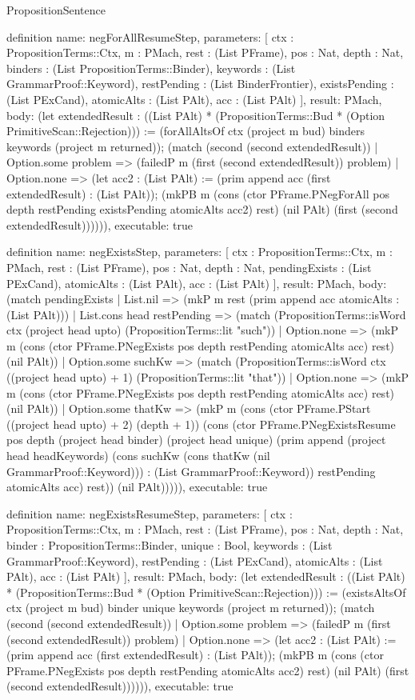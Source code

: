 \begin{lexlean}{PropositionSentence}
\begin{semanticmodule}
definition{
  name: negForAllResumeStep,
  parameters: [
    ctx : PropositionTerms::Ctx,
    m : PMach,
    rest : (List PFrame),
    pos : Nat,
    depth : Nat,
    binders : (List PropositionTerms::Binder),
    keywords : (List GrammarProof::Keyword),
    restPending : (List BinderFrontier),
    existsPending : (List PExCand),
    atomicAlts : (List PAlt),
    acc : (List PAlt)
  ],
  result: PMach,
  body: (let extendedResult : ((List PAlt) * (PropositionTerms::Bud * (Option PrimitiveScan::Rejection))) := (forAllAltsOf ctx (project m bud) binders keywords (project m returned)); (match (second (second extendedResult))
    | Option.some problem => (failedP m (first (second extendedResult)) problem)
    | Option.none => (let acc2 : (List PAlt) := (prim append acc (first extendedResult) : (List PAlt)); (mkPB m (cons (ctor PFrame.PNegForAll pos depth restPending existsPending atomicAlts acc2) rest) (nil PAlt) (first (second extendedResult)))))),
  executable: true
}

definition{
  name: negExistsStep,
  parameters: [
    ctx : PropositionTerms::Ctx,
    m : PMach,
    rest : (List PFrame),
    pos : Nat,
    depth : Nat,
    pendingExists : (List PExCand),
    atomicAlts : (List PAlt),
    acc : (List PAlt)
  ],
  result: PMach,
  body: (match pendingExists
    | List.nil => (mkP m rest (prim append acc atomicAlts : (List PAlt)))
    | List.cons head restPending => (match (PropositionTerms::isWord ctx (project head upto) (PropositionTerms::lit "such"))
        | Option.none => (mkP m (cons (ctor PFrame.PNegExists pos depth restPending atomicAlts acc) rest) (nil PAlt))
        | Option.some suchKw => (match (PropositionTerms::isWord ctx ((project head upto) + 1) (PropositionTerms::lit "that"))
            | Option.none => (mkP m (cons (ctor PFrame.PNegExists pos depth restPending atomicAlts acc) rest) (nil PAlt))
            | Option.some thatKw => (mkP m (cons (ctor PFrame.PStart ((project head upto) + 2) (depth + 1)) (cons (ctor PFrame.PNegExistsResume pos depth (project head binder) (project head unique) (prim append (project head headKeywords) (cons suchKw (cons thatKw (nil GrammarProof::Keyword))) : (List GrammarProof::Keyword)) restPending atomicAlts acc) rest)) (nil PAlt))))),
  executable: true
}

definition{
  name: negExistsResumeStep,
  parameters: [
    ctx : PropositionTerms::Ctx,
    m : PMach,
    rest : (List PFrame),
    pos : Nat,
    depth : Nat,
    binder : PropositionTerms::Binder,
    unique : Bool,
    keywords : (List GrammarProof::Keyword),
    restPending : (List PExCand),
    atomicAlts : (List PAlt),
    acc : (List PAlt)
  ],
  result: PMach,
  body: (let extendedResult : ((List PAlt) * (PropositionTerms::Bud * (Option PrimitiveScan::Rejection))) := (existsAltsOf ctx (project m bud) binder unique keywords (project m returned)); (match (second (second extendedResult))
    | Option.some problem => (failedP m (first (second extendedResult)) problem)
    | Option.none => (let acc2 : (List PAlt) := (prim append acc (first extendedResult) : (List PAlt)); (mkPB m (cons (ctor PFrame.PNegExists pos depth restPending atomicAlts acc2) rest) (nil PAlt) (first (second extendedResult)))))),
  executable: true
}


\end{semanticmodule}
\end{lexlean}
